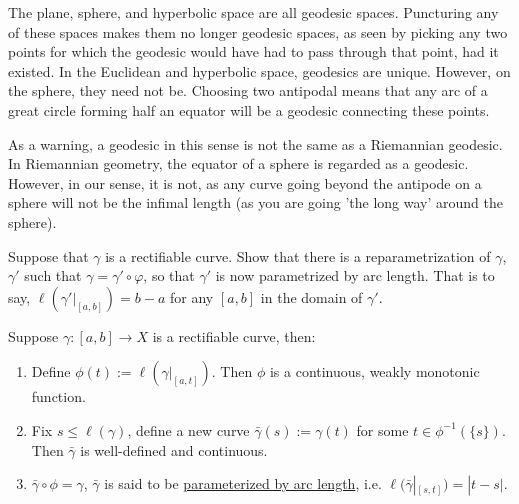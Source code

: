 \documentclass[12pt]{amsart}
\begin{document}
\begin{example}
The plane, sphere, and hyperbolic space are all geodesic spaces. Puncturing any of these spaces makes them no longer geodesic spaces, as seen by picking any two points for which the geodesic would have had to pass through that point, had it existed. In the Euclidean and hyperbolic space, geodesics are unique. However, on the sphere, they need not be. Choosing two antipodal means that any arc of a great circle forming half an equator will be a geodesic connecting these points.

As a warning, a geodesic in this sense is not the same as a Riemannian geodesic. In Riemannian geometry, the equator of a sphere is regarded as a geodesic. However, in our sense, it is not, as any curve going beyond the antipode on a sphere will not be the infimal length (as you are going 'the long way' around the sphere).
\end{example}

\begin{exercise}
Suppose that $\gamma$ is a rectifiable curve. Show that there is a reparametrization of $\gamma$, $\gamma'$ such that $\gamma = \gamma' \circ \varphi$, so that $\gamma'$ is now parametrized by arc length. That is to say, $\ell(\gamma'|_{[a,b]}) = b - a$ for any $[a,b]$ in the domain of $\gamma'$.
\end{exercise}
\begin{exercise}
Suppose $\gamma:[a,b]\rightarrow X$ is a rectifiable curve, then:
\begin{enumerate}
    \item Define $\phi(t):=\ell(\gamma|_{[a,t]})$. Then $\phi$ is a continuous, weakly monotonic function.\\
    \item Fix $s\le\ell(\gamma)$, define a new curve $\bar{\gamma}(s):=\gamma(t)$ for some $t\in\phi^{-1}(\{s\})$. Then $\bar{\gamma}$ is well-defined and continuous.\\
    \item $\bar{\gamma}\circ\phi=\gamma$, $\bar{\gamma}$ is said to be \underline{parameterized by arc length}, i.e. $\ell(\bar{\gamma}|_{[s,t]})=|t-s|$.
\end{enumerate}
\end{exercise}
\end{document}

